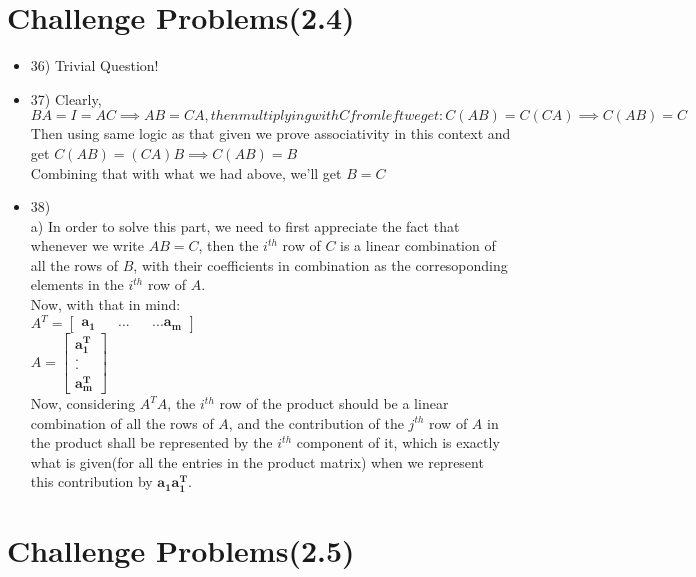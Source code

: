 \documentclass{article}
\begin{document}
\begin{itemize}
\end{itemize}

\section{Challenge Problems(2.4)}

\begin{itemize}
  \item 36) Trivial Question!
  \item 37) Clearly, $BA = I = AC \implies AB = CA, then multiplying with C from left we get: C(AB) = C(CA) \implies C(AB) = C$ \\
  Then using same logic as that given we prove associativity in this context and get $C(AB) = (CA)B \implies C(AB) = B$ \\
  Combining that with what we had above, we'll get $B =C$
  \item 38) \\ a) In order to solve this part, we need to first appreciate the fact that whenever we write $AB=C$, then the $i^{th}$ row of $C$ is a linear combination of all the rows of $B$, with their coefficients in combination as the corresoponding elements in the $i^{th}$ row of $A$.  \\
  Now, with that in mind: \\
  $A^{T} = \begin{bmatrix}\mathbf{a_1} && ... && ... \mathbf{a_m}\end{bmatrix}$ \\
  $A = \begin{bmatrix}\mathbf{a_1^{T}} \\ . \\ . \\ \mathbf{a_m^{T}}\end{bmatrix}$ \\
  Now, considering $A^{T}A$, the $i^{th}$ row of the product should be a linear combination of all the rows of $A$, and the contribution of the $j^{th}$ row of $A$ in the product shall be represented by the $i^{th}$ component of it, which is exactly what is given(for all the entries in the product matrix) when we represent this contribution by $\mathbf{a_1 a_1^{T}}$.

\end{itemize}

\section{Challenge Problems(2.5)}
\end{document}
